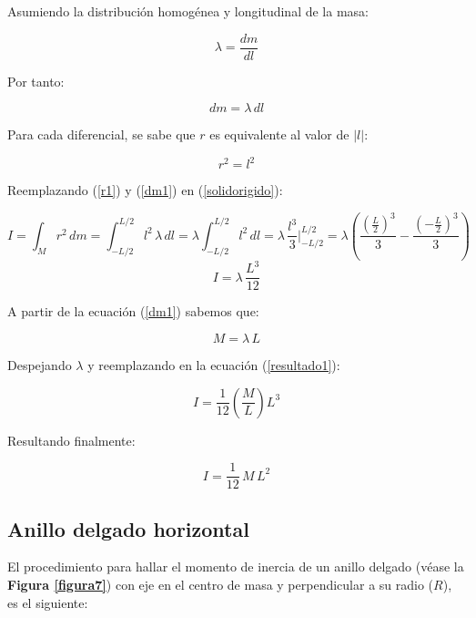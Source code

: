 \documentclass[letter,twoside,11pt]{article}
\begin{document}
Asumiendo la distribución homogénea y longitudinal de la masa:

\begin{equation*}
    \lambda = \frac{dm}{dl}
\end{equation*}

Por tanto:

\begin{equation}
    dm = \lambda\, dl
\label{dm1}
\end{equation}

Para cada diferencial, se sabe que $r$ es equivalente al valor de
$|l|$:

\begin{equation}
    r^2 = l^2
\label{r1}
\end{equation}

Reemplazando (\ref{r1}) y (\ref{dm1}) en (\ref{solidorigido}):

\begin{equation*}
    I = \int_{M} r^2\, dm = \int_{-L/2}^{L/2} l^2\, \lambda\, dl = \lambda \int_{-L/2}^{L/2} l^2\, dl = \lambda\, \frac{l^3}{3} \Biggr|_{-L/2}^{L/2} = \lambda \left( \frac{(\frac{L}{2})^3}{3} - \frac{(-\frac{L}{2})^3}{3} \right)
\end{equation*}
\begin{equation}
    I = \lambda\, \frac{L^3}{12}
\label{resultado1}
\end{equation}

A partir de la ecuación (\ref{dm1}) sabemos que:

\begin{equation*}
    M = \lambda\, L
\end{equation*}

Despejando $\lambda$ y reemplazando en la ecuación (\ref{resultado1}):

\begin{equation*}
    I = \frac{1}{12} \left( \frac{M}{L} \right) L^3
\end{equation*}

Resultando finalmente:

\begin{equation}
    I = \frac{1}{12}\, M\, L^2
\end{equation}

\subsection{Anillo delgado horizontal}
El procedimiento para hallar el momento de inercia de un anillo delgado (véase
la \textbf{Figura \ref{figura7}}) con eje en el centro de masa y perpendicular a
su radio ($R$), es el siguiente:
\end{document}
